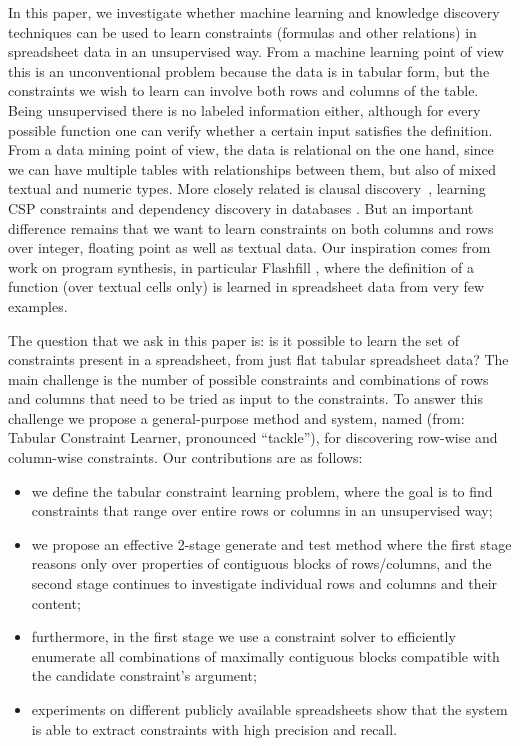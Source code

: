 In this paper,  we investigate whether machine learning and knowledge discovery techniques can be used to learn constraints (formulas and other relations) in spreadsheet data in an unsupervised way.
From a machine learning point of view this is an unconventional problem because the data is in tabular form, but the constraints we wish to learn can involve both rows and columns of the table. Being unsupervised there is no labeled information either, although for every possible function one can verify whether a certain input satisfies the definition.
From a data mining point of view, the data is relational on the one hand, since we can have multiple tables with relationships between them, but also of mixed textual and numeric types. More closely related is clausal discovery~\cite{claudien,lallouet}, learning CSP constraints \cite{Quacq,Conacq,modelseeker} and dependency discovery in databases \cite{savnik}. But an important difference remains that we want to learn constraints on both columns and rows over integer, floating point as well as textual data.
Our inspiration comes from work on program synthesis, in particular Flashfill \cite{flashfill}, where the definition of a function (over textual cells only) is learned in spreadsheet data from very few examples.


The question that we ask in this paper is: is it possible to learn the set of constraints present in a spreadsheet, from just flat tabular spreadsheet data? The main challenge is the number of possible constraints and combinations of rows and columns that need to be tried as input to the constraints.
To answer this challenge we propose a general-purpose method and system, named \sname (from: Tabular Constraint Learner, pronounced ``tackle''), for discovering row-wise and column-wise constraints.
%
Our contributions are as follows:
\begin{itemize}
\item we define the tabular constraint learning problem, where the goal is to find constraints that range over entire rows or columns in an unsupervised way;
\item we propose an effective 2-stage generate and test method where the first stage reasons only over properties of contiguous blocks of rows/columns, and the second stage continues to investigate individual rows and columns and their content;
\item furthermore, in the first stage we use a constraint solver to efficiently enumerate all combinations of maximally contiguous blocks compatible with the candidate constraint's argument; %
\item experiments on different publicly available spreadsheets show that the system is able to extract constraints with high precision and recall. 
\end{itemize}


